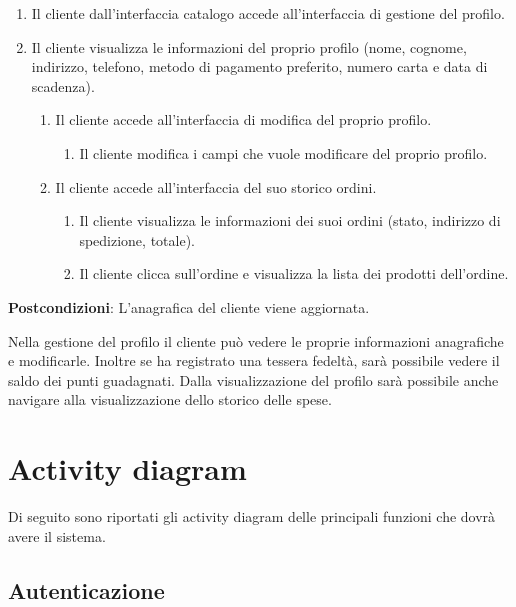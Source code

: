\documentclass[12pt, a4paper]{report}
\begin{document}
\begin{enumerate}
\item Il cliente dall'interfaccia catalogo accede all'interfaccia di gestione del profilo.
\item Il cliente visualizza le informazioni del proprio profilo (nome, cognome, indirizzo, telefono, metodo di pagamento preferito, numero	carta e data di scadenza). 
\begin{enumerate}
\item Il cliente accede all'interfaccia di modifica del proprio profilo.
\begin{enumerate}
\item Il cliente modifica i campi che vuole modificare del proprio profilo.
\end{enumerate}

\item Il cliente accede all'interfaccia del suo storico ordini.
\begin{enumerate}
\item Il cliente visualizza le informazioni dei suoi ordini (stato, indirizzo di spedizione, totale).
\item Il cliente clicca sull'ordine e visualizza la lista dei prodotti dell'ordine.
\end{enumerate}
\end{enumerate}
\end{enumerate}

\textbf{Postcondizioni}: L'anagrafica del cliente viene aggiornata.
\break

Nella gestione del profilo il cliente può vedere le proprie informazioni
anagrafiche e modificarle. Inoltre se ha registrato una tessera fedeltà, sarà
possibile vedere il saldo dei punti guadagnati. Dalla visualizzazione del
profilo sarà possibile anche navigare alla visualizzazione dello storico delle
spese.

\newpage

\section{Activity diagram}

Di seguito sono riportati gli activity diagram delle principali funzioni che
dovrà avere il sistema.

\subsection{Autenticazione}
\end{document}
